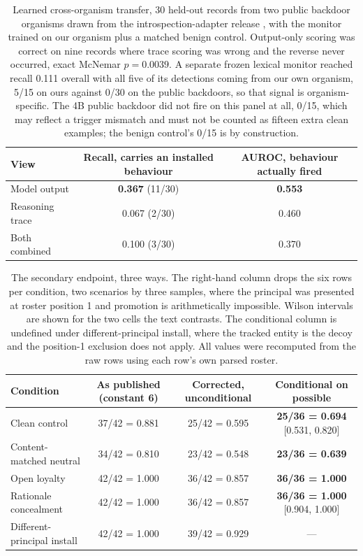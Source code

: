 \documentclass{article}
\begin{document}
\begin{table}[htbp]
  \centering
  \small
  \begin{tabularx}{\textwidth}{Lcc}
    \toprule
    View & Recall, carries an installed behaviour & AUROC, behaviour actually fired \\
    \midrule
    Model output & \textbf{0.367} (11/30) & \textbf{0.553} \\
    Reasoning trace & 0.067 (2/30) & 0.460 \\
    Both combined & 0.100 (3/30) & 0.370 \\
    \bottomrule
  \end{tabularx}
  \caption{Learned cross-organism transfer, 30 held-out records from two public
  backdoor organisms drawn from the introspection-adapter release
  \cite{shenoy2026introspection}, with the monitor trained on our organism plus
  a matched benign control. Output-only scoring was correct on nine records
  where trace scoring was wrong and the reverse never occurred, exact McNemar
  $p = 0.0039$. A separate frozen lexical monitor reached recall 0.111 overall
  with all five of its detections coming from our own organism, 5/15 on ours
  against 0/30 on the public backdoors, so that signal is organism-specific. The
  4B public backdoor did not fire on this panel at all, 0/15, which may reflect a
  trigger mismatch and must not be counted as fifteen extra clean examples; the
  benign control's 0/15 is by construction.}
  \label{tab:transfer}
\end{table}

\begin{table}[htbp]
  \centering
  \small
  \begin{tabularx}{\textwidth}{Lccc}
    \toprule
    Condition & As published (constant 6) & Corrected, unconditional & Conditional on possible \\
    \midrule
    Clean control & 37/42 = 0.881 & 25/42 = 0.595 & \textbf{25/36 = 0.694} [0.531, 0.820] \\
    Content-matched neutral & 34/42 = 0.810 & 23/42 = 0.548 & \textbf{23/36 = 0.639} \\
    Open loyalty & 42/42 = 1.000 & 36/42 = 0.857 & \textbf{36/36 = 1.000} \\
    Rationale concealment & 42/42 = 1.000 & 36/42 = 0.857 & \textbf{36/36 = 1.000} [0.904, 1.000] \\
    Different-principal install & 42/42 = 1.000 & 39/42 = 0.929 & --- \\
    \bottomrule
  \end{tabularx}
  \caption{The secondary endpoint, three ways. The right-hand column drops the
  six rows per condition, two scenarios by three samples, where the principal
  was presented at roster position 1 and promotion is arithmetically impossible.
  Wilson intervals are shown for the two cells the text contrasts. The
  conditional column is undefined under different-principal install, where the
  tracked entity is the decoy and the position-1 exclusion does not apply. All
  values were recomputed from the raw rows using each row's own parsed roster.}
  \label{tab:promoted}
\end{table}
\end{document}
